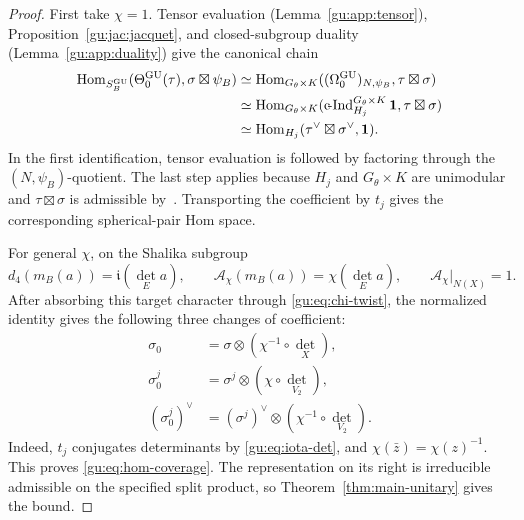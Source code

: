 \begin{proof}
First take $\chi=1$. Tensor evaluation (Lemma~\ref{gu:app:tensor}),
Proposition~\ref{gu:jac:jacquet}, and closed-subgroup duality
(Lemma~\ref{gu:app:duality}) give the canonical chain
\begin{equation}\label{gu:eq:hom-zero}
 \begin{aligned}
 \operatorname{Hom}_{S_B^{\operatorname{GU}}}(\Theta_0^{\operatorname{GU}}(\tau),\sigma\boxtimes\psi_B)
 &\simeq\operatorname{Hom}_{G_\theta\times K}((\Omega_0^{\operatorname{GU}})_{N,\psi_B},
                                      \tau\boxtimes\sigma)\\
 &\simeq\operatorname{Hom}_{G_\theta\times K}(\operatorname{c\!-Ind}_{H_j}^{G_\theta\times K}\mathbf1,
                                      \tau\boxtimes\sigma)\\
 &\simeq\operatorname{Hom}_{H_j}(\tau^\vee\boxtimes\sigma^\vee,\mathbf1).
 \end{aligned}
\end{equation}
In the first identification, tensor evaluation is followed by factoring
through the $(N,\psi_B)$-quotient.
The last step applies because $H_j$ and $G_\theta\times K$ are unimodular and
$\tau\boxtimes\sigma$ is admissible by~\cite[Proposition~2.16]{BZ76}.
Transporting the coefficient by $t_j$ gives the corresponding
spherical-pair Hom space.

For general $\chi$, on the Shalika subgroup
\[
 d_4(m_B(a))=\mathfrak i(\det_Ea),\qquad
 \mathcal A_\chi(m_B(a))=\chi(\det_Ea),\qquad
 \mathcal A_\chi|_{N(X)}=1.
\]
After absorbing this target character through \eqref{gu:eq:chi-twist},
the normalized identity gives the following three changes of coefficient:
\begin{equation}\label{gu:eq:coefficient-three-steps}
 \begin{aligned}
 \sigma_0&=\sigma\otimes(\chi^{-1}\circ\det_X),\\
 \sigma_0^j&=\sigma^j\otimes(\chi\circ\det_{V_2}),\\
 (\sigma_0^j)^\vee&=(\sigma^j)^\vee
                        \otimes(\chi^{-1}\circ\det_{V_2}).
 \end{aligned}
\end{equation}
Indeed, $t_j$ conjugates determinants by \eqref{gu:eq:iota-det}, and
$\chi(\bar z)=\chi(z)^{-1}$. This proves \eqref{gu:eq:hom-coverage}.
The representation on its right is irreducible admissible on the
specified split product, so Theorem~\ref{thm:main-unitary} gives the bound.
\end{proof}
